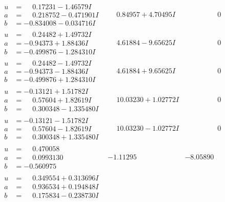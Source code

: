 \documentclass[1p]{elsarticle_modified}
\theoremstyle{definition}
\begin{document}
$$\begin{array}{c|c|c}
\begin{aligned}
u &= \phantom{-}0.17231 - 1.46579 I \\
a &= \phantom{-}0.218752 - 0.471901 I \\
b &= -0.834008 - 0.034716 I\end{aligned}
 & \phantom{-}0.84957 + 4.70495 I & \phantom{-0.000000 } 0 \\ \hline\begin{aligned}
u &= \phantom{-}0.24482 + 1.49732 I \\
a &= -0.94373 + 1.88436 I \\
b &= -0.499876 - 1.284310 I\end{aligned}
 & \phantom{-}4.61884 - 9.65625 I & \phantom{-0.000000 } 0 \\ \hline\begin{aligned}
u &= \phantom{-}0.24482 - 1.49732 I \\
a &= -0.94373 - 1.88436 I \\
b &= -0.499876 + 1.284310 I\end{aligned}
 & \phantom{-}4.61884 + 9.65625 I & \phantom{-0.000000 } 0 \\ \hline\begin{aligned}
u &= -0.13121 + 1.51782 I \\
a &= \phantom{-}0.57604 + 1.82619 I \\
b &= \phantom{-}0.300348 - 1.335480 I\end{aligned}
 & \phantom{-}10.03230 + 1.02772 I & \phantom{-0.000000 } 0 \\ \hline\begin{aligned}
u &= -0.13121 - 1.51782 I \\
a &= \phantom{-}0.57604 - 1.82619 I \\
b &= \phantom{-}0.300348 + 1.335480 I\end{aligned}
 & \phantom{-}10.03230 - 1.02772 I & \phantom{-0.000000 } 0 \\ \hline\begin{aligned}
u &= \phantom{-}0.470058\phantom{ +0.000000I} \\
a &= \phantom{-}0.0993130\phantom{ +0.000000I} \\
b &= -0.560975\phantom{ +0.000000I}\end{aligned}
 & -1.11295\phantom{ +0.000000I} & -8.05890\phantom{ +0.000000I} \\ \hline\begin{aligned}
u &= \phantom{-}0.349554 + 0.313696 I \\
a &= \phantom{-}0.936534 + 0.194848 I \\
b &= \phantom{-}0.175834 - 0.238730 I\end{aligned}

\end{array}$$
\end{document}
